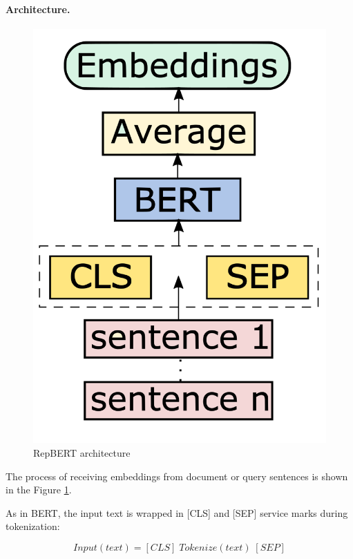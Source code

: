 \documentclass[
    twocolumn,
]{ceurart}
\begin{document}
    \paragraph{Architecture.}
    \begin{figure}[h]
        \centering
        \includegraphics[scale=0.2]{RepBERT.png}
        \caption{RepBERT architecture}
        \label{fig:RepBERT}
    \end{figure}
    The process of receiving embeddings from document or query sentences is shown
    in the Figure \ref{fig:RepBERT}.

    As in BERT\cite{BERT}, the input text is wrapped in [CLS] and [SEP] service marks
    during tokenization:

    \begin{equation}
        Input(text) = [CLS]\;Tokenize(text)\;[SEP]
    \end{equation}
\end{document}
